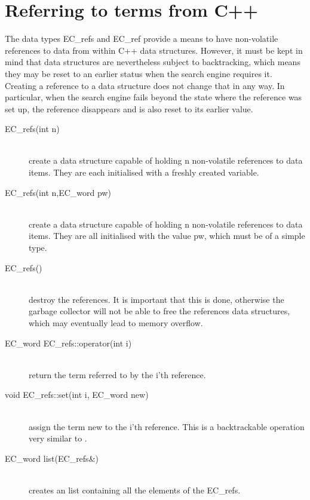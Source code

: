 \section{Referring to {\eclipse} terms from C++}
The data types EC_refs and EC_ref provide a means to have non-volatile
references to {\eclipse} data from within C++ data structures. However,
it must be kept in mind that {\eclipse} data structures are nevertheless
subject to backtracking, which means they may be reset to an earlier
status when the search engine requires it. Creating a reference to
a data structure does not change that in any way. In particular, 
when the search engine fails beyond the state where the reference was
set up, the reference disappears and is also reset to its earlier value.
\begin{description}
\item[EC_refs(int n)]\ \\
	create a data structure capable of holding n non-volatile
	references to {\eclipse} data items. They are each initialised
	with a freshly created {\eclipse} variable.

\item[EC_refs(int n,EC_word pw)]\ \\
	create a data structure capable of holding n non-volatile
	references to {\eclipse} data items. They are all initialised
	with the value pw, which must be of a simple type.

\item[\tld EC_refs()]\ \\
	destroy the {\eclipse} references. It is important that this
	is done, otherwise the {\eclipse} garbage collector will not
	be able to free the references data structures, which may
	eventually lead to memory overflow.

\item[EC_word EC_refs::operator\nil(int i)]\ \\
	return the {\eclipse} term referred to by the i'th reference.

\item[void EC_refs::set(int i, EC_word new)]\ \\
	assign the term new to the i'th reference.
	This is a backtrackable operation very similar to
	.

\item[EC_word list(EC_refs\&)]\ \\
	creates an {\eclipse} list containing all the elements of the EC_refs.


\end{description}
